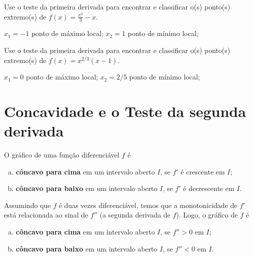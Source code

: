 \begin{exer}
    Use o teste da primeira derivada para encontrar e classificar o(s) ponto(s) extremo(s) de $\displaystyle f(x) = \frac{x^3}{3}-x$.
\end{exer}
\begin{resp}
  $x_1=-1$ ponto de máximo local; $x_2=1$ ponto de mínimo local;
\end{resp}

\begin{exer}
  Use o teste da primeira derivada para encontrar e classificar o(s) ponto(s) extremo(s) de $\displaystyle f(x) = x^{2/3}(x-1)$.
\end{exer}
\begin{resp}
  $x_1=0$ ponto de máximo local; $x_2=2/5$ ponto de mínimo local;
\end{resp}


\section{Concavidade e o Teste da segunda derivada}\label{cap_apderiv_sec_tder2}

O gráfico de uma função diferenciável $f$ é
\begin{enumerate}[a)]
\item {\bf côncavo para cima} em um intervalo aberto $I$, se $f'$ é crescente em $I$;
\item {\bf côncavo para baixo} em um intervalo aberto $I$, se $f'$ é decrescente em $I$.
\end{enumerate}

Assumindo que $f$ é duas vezes diferenciável, temos que a monotonicidade de $f'$ está relacionada ao sinal de $f''$ (a segunda derivada de $f$). Logo, o gráfico de $f$ é
\begin{enumerate}[a)]
\item {\bf côncavo para cima} em um intervalo aberto $I$, se $f'' > 0$ em $I$;
\item {\bf côncavo para baixo} em um intervalo aberto $I$, se $f'' < 0$ em $I$.
\end{enumerate}


